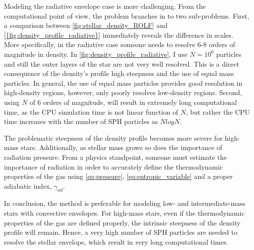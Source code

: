 Modeling the radiative envelope case is more challenging. From the computational point of view, the problem branches in to two sub-problems. First, a comparison between \cref{fig:stellar_density_ROLF} and \cref{{fig:density_profile_radiative}} immediately reveals the difference in scales. More specifically, in the radiative case someone needs to resolve 6-8 orders of magnitude in density. In \cref{fig:density_profile_radiative}, I use $N=10^6$ particles and still the outer layers of the star are not very well resolved. This is a direct consequence of the density's profile high steepness and the use of equal mass particles. In general, the use of equal mass particles provides good resolution in high-density regions, however, only poorly resolves low-density regions. Second, using $N$ of 6 orders of magnitude, will result in extremely long computational time, as the CPU simulation time is not linear function of $N$, but rather the CPU time increases with the number of SPH particles as $NlogN$.

The problematic steepness of the density profile becomes more severe for high-mass stars. Additionally, as stellar mass grows so does the importance of radiation pressure. From a physics standpoint, someone must estimate the importance of radiation in order to accurately define the thermodynamic properties of the gas using \cref{eq:pressure}, \cref{eq:entropic_variable} and a proper adiabatic index, $\gamma_{ad}$.

In conclusion, the method is preferable for modeling low- and intermediate-mass stars with convective envelopes. For high-mass stars, even if the thermodynamic properties of the gas are defined properly, the intrinsic steepness of the density profile will remain.  Hence, a very high number of SPH particles are needed to resolve the stellar envelope, which result in very long computational times. 

